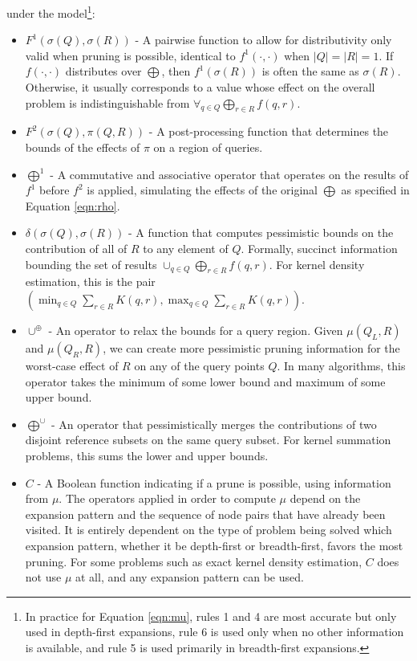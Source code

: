 \documentclass[times, 10pt,twocolumn]{article}
\newcommand{\union}{\cup}
\newcommand{\muv}{\union^{\oplus}}
\newcommand{\bigmuh}{\bigoplus^{\union}}
\newcommand{\allsigma}{\sigma}
\begin{document}
under the model\footnote{In practice for Equation \ref{eqn:mu}, rules 1 and 4 are most accurate but only used in depth-first expansions, rule 6 is used only when no other information is available, and rule 5 is used primarily in breadth-first expansions.}:
\begin{itemize}
  \item $F^1(\allsigma(Q), \allsigma(R))$ - A pairwise function to allow for distributivity only valid when pruning is possible, identical to $f^1(\cdot, \cdot)$ when $|Q| = |R| = 1$.
  If $f(\cdot, \cdot)$ distributes over $\bigoplus$, then $f^1(\allsigma(R))$ is often the same as $\allsigma(R)$.
  Otherwise, it usually corresponds to a value whose effect on the overall problem is indistinguishable from $\forall_{q \in Q} \bigoplus_{r \in R} f(q, r)$.
  \item $F^2(\allsigma(Q), \pi(Q, R))$ - A post-processing function that determines the bounds of the effects of $\pi$ on a region of queries.
  \item $\bigoplus^{1}$ - A commutative and associative operator that operates on the results of $f^1$ before $f^2$ is applied, simulating the effects of the original $\bigoplus$ as specified in Equation \ref{eqn:rho}.
  \item $\delta(\allsigma(Q), \allsigma(R))$ - A function that computes pessimistic bounds on the contribution of all of $R$ to any element of $Q$.
  Formally, succinct information bounding the set of results $\union_{q \in Q} \bigoplus_{r \in R} f(q, r)$.
  For kernel density estimation, this is the pair $(\min_{q \in Q} \sum_{r \in R} K(q, r), \max_{q \in Q} \sum_{r \in R} K(q, r))$.
  \item $\muv$ - An operator to relax the bounds for a query region.
  Given $\mu(Q_L, R)$ and $\mu(Q_R, R)$, we can create more pessimistic pruning information for the worst-case effect of $R$ on any of the query points $Q$.
  In many algorithms, this operator takes the minimum of some lower bound and maximum of some upper bound.
  \item $\bigmuh$ - An operator that pessimistically merges the contributions of two disjoint reference subsets on the same query subset.
  For kernel summation problems, this sums the lower and upper bounds.
  \item $C$ - A Boolean function indicating if a prune is possible, using information from $\mu$.
  The operators applied in order to compute $\mu$ depend on the expansion pattern and the sequence of node pairs that have already been visited.
  It is entirely dependent on the type of problem being solved which expansion pattern, whether it be depth-first or breadth-first, favors the most pruning.
 For some problems such as exact kernel density estimation, $C$ does not use $\mu$ at all, and any expansion pattern can be used.
\end{itemize}
\end{document}
